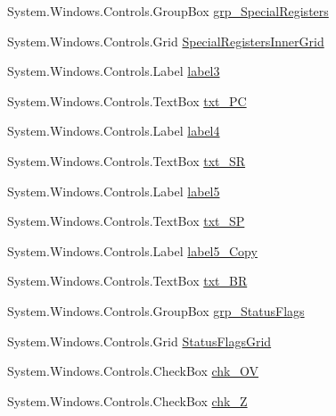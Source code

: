 \begin{DoxyCompactItemize}
System.\+Windows.\+Controls.\+Group\+Box \hyperlink{class_c_p_u___o_s___simulator_1_1_main_window_a02e4a81d8689928cb1d459fd3c01bfdf}{grp\+\_\+\+Special\+Registers}
\item 
System.\+Windows.\+Controls.\+Grid \hyperlink{class_c_p_u___o_s___simulator_1_1_main_window_aeef1e97d3e7d589fdab51828260c7b5a}{Special\+Registers\+Inner\+Grid}
\item 
System.\+Windows.\+Controls.\+Label \hyperlink{class_c_p_u___o_s___simulator_1_1_main_window_a94cf4fbdaebb09776745893c2bce1126}{label3}
\item 
System.\+Windows.\+Controls.\+Text\+Box \hyperlink{class_c_p_u___o_s___simulator_1_1_main_window_a7100765f8e26fa4c97a76dd445942b97}{txt\+\_\+\+P\+C}
\item 
System.\+Windows.\+Controls.\+Label \hyperlink{class_c_p_u___o_s___simulator_1_1_main_window_a3473dc873d8c8d8f4bba6e83f5684299}{label4}
\item 
System.\+Windows.\+Controls.\+Text\+Box \hyperlink{class_c_p_u___o_s___simulator_1_1_main_window_a9135c01bacd48e517d7cf46f69ea87d2}{txt\+\_\+\+S\+R}
\item 
System.\+Windows.\+Controls.\+Label \hyperlink{class_c_p_u___o_s___simulator_1_1_main_window_a37b18e7542e985a8984375d0b1cf441e}{label5}
\item 
System.\+Windows.\+Controls.\+Text\+Box \hyperlink{class_c_p_u___o_s___simulator_1_1_main_window_ac2427655774b9ca2b4c368651d5cd9de}{txt\+\_\+\+S\+P}
\item 
System.\+Windows.\+Controls.\+Label \hyperlink{class_c_p_u___o_s___simulator_1_1_main_window_aadfe7782d7e25b730849222805a541f9}{label5\+\_\+\+Copy}
\item 
System.\+Windows.\+Controls.\+Text\+Box \hyperlink{class_c_p_u___o_s___simulator_1_1_main_window_a7a878022ed4cb948598d3685dc821a00}{txt\+\_\+\+B\+R}
\item 
System.\+Windows.\+Controls.\+Group\+Box \hyperlink{class_c_p_u___o_s___simulator_1_1_main_window_a9947d1946c8258ea1fb77d860baa7e0f}{grp\+\_\+\+Status\+Flags}
\item 
System.\+Windows.\+Controls.\+Grid \hyperlink{class_c_p_u___o_s___simulator_1_1_main_window_afdda5e5a39c6e3b99300284ea2640e7c}{Status\+Flags\+Grid}
\item 
System.\+Windows.\+Controls.\+Check\+Box \hyperlink{class_c_p_u___o_s___simulator_1_1_main_window_adfbc519740506214093673b8015ea67d}{chk\+\_\+\+O\+V}
\item 
System.\+Windows.\+Controls.\+Check\+Box \hyperlink{class_c_p_u___o_s___simulator_1_1_main_window_a70c1a75df218201391cf5e0615a600f1}{chk\+\_\+\+Z}

\end{DoxyCompactItemize}
